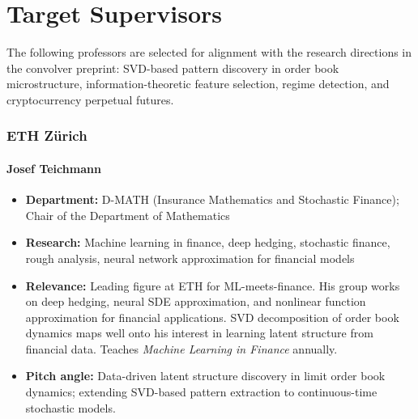 \documentclass[11pt,a4paper]{article}
\begin{document}
\newpage

\part{Target Supervisors}

The following professors are selected for alignment with the research directions in the convolver preprint: SVD-based pattern discovery in order book microstructure, information-theoretic feature selection, regime detection, and cryptocurrency perpetual futures.

\section{ETH Z\"urich}

\subsection{Josef Teichmann}
\begin{itemize}
  \item \textbf{Department:} D-MATH (Insurance Mathematics and Stochastic Finance); Chair of the Department of Mathematics
  \item \textbf{Research:} Machine learning in finance, deep hedging, stochastic finance, rough analysis, neural network approximation for financial models
  \item \textbf{Relevance:} Leading figure at ETH for ML-meets-finance. His group works on deep hedging, neural SDE approximation, and nonlinear function approximation for financial applications. SVD decomposition of order book dynamics maps well onto his interest in learning latent structure from financial data. Teaches \textit{Machine Learning in Finance} annually.
  \item \textbf{Pitch angle:} Data-driven latent structure discovery in limit order book dynamics; extending SVD-based pattern extraction to continuous-time stochastic models.
\end{itemize}
\end{document}
